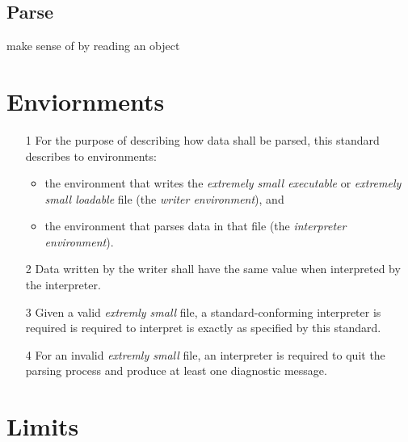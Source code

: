 \documentclass[a4paper]{article}
\begin{document}
    \subsection{Parse}
    make sense of by reading an object


    \section{Enviornments}

    \begin{enumerate}
        \item[1 ] For the purpose of describing how data shall be parsed, this standard describes to environments:
            \begin{itemize}
                \item the environment that writes the \emph{extremely small executable} or \emph{extremely small loadable} file (the \emph{writer environment}), and
                \item the environment that parses data in that file (the \emph{interpreter environment}).
            \end{itemize} 
        \item[2 ] Data written by the writer shall have the same value when interpreted by the interpreter\footnotemark[2].
        \item[3 ] Given a valid \emph{extremly small} file, a standard-conforming interpreter is required is required to interpret is exactly as specified by this standard.
        \item[4 ] For an invalid \emph{extremly small} file, an interpreter is required to quit the parsing process and produce at least one diagnostic message.
    \end{enumerate}


    \section{Limits}
\end{document}
